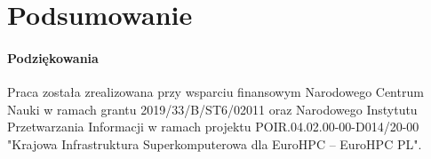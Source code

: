 \documentclass[a4paper,11pt]{article}
\begin{document}
\section{Podsumowanie}


\paragraph{Podziękowania}
Praca została zrealizowana przy wsparciu finansowym Narodowego Centrum Nauki w ramach grantu 2019/33/B/ST6/02011 oraz Narodowego Instytutu Przetwarzania Informacji w ramach projektu POIR.04.02.00-00-D014/20-00 "Krajowa Infrastruktura Superkomputerowa dla EuroHPC -- EuroHPC PL".

\newpage
\pagestyle{empty}


\end{document}

